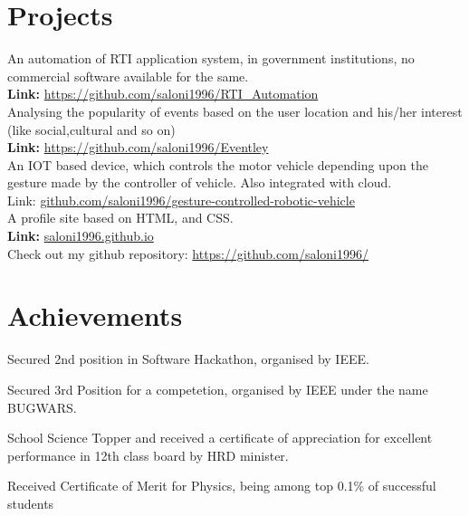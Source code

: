 \documentclass[]{hieudo-build}
\begin{document}
\begin{minipage}[t]{0.69\textwidth} 

\section{Projects}

\descript{}
An automation of RTI application system, in government institutions, no commercial software available for the same. \\
\textbf{Link:} \url{https://github.com/saloni1996/RTI_Automation}
\sectionsep\\
\descript{}
Analysing the popularity of events based on the user location and his/her interest (like social,cultural and so on)\\
\textbf{Link:} \url{https://github.com/saloni1996/Eventley}
\sectionsep\\
\descript{}
An IOT based device, which controls the motor vehicle depending upon the gesture made by the controller of vehicle. Also integrated with cloud.\\
Link: \url{github.com/saloni1996/gesture-controlled-robotic-vehicle}\\
\sectionsep 
{}
\descript{}
A profile site based on HTML, and CSS. \\
 \textbf{Link:} \url{saloni1996.github.io}
\sectionsep\\
\descript{}
Check out my github repository: \url{https://github.com/saloni1996/}
\sectionsep

\section{Achievements}

\vspace{0.5em} 
\begin{tightemize}

\item Secured 2nd position in Software Hackathon, organised by IEEE.
\item Secured 3rd Position for a competetion, organised by IEEE under the name BUGWARS.
\item School Science Topper and received a certificate of appreciation for excellent performance in 12th class board by HRD minister.
\item Received Certificate of Merit for Physics, being among top 0.1\% of successful students
\end{tightemize}
\sectionsep



\end{minipage}
\end{document}
